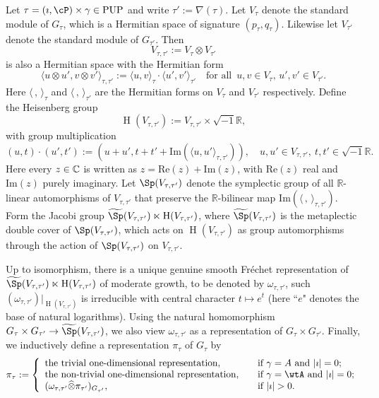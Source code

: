 \documentclass[11pt,a4paper]{amsart}
\def\abs#1{\left|{#1}\right|}
\newcommand{\oH}{\operatorname{H}}
\newcommand{\R}{\mathbb R}
\newcommand{\la}{\langle}
\newcommand{\ra}{\rangle}
\numberwithin{equation}{section}
\theoremstyle{remark}
\begin{document}
Let $\tau=(\imath, \cP)\times \gamma \in \mathrm{PUP}$ and write $\tau':=\nabla(\tau)$. Let $V_\tau$ denote the standard module of $G_\tau$, which is a Hermitian space of signature $(p_\tau, q_\tau)$. Likewise let $V_{\tau'}$ denote the standard module of $G_{\tau'}$. Then \[
  V_{\tau, \tau'}:=V_{\tau}\otimes V_{\tau'}
\]
is also a Hermitian space with the Hermitian form
\[
  \la u\otimes u', v\otimes v'\ra_{\tau, \tau'}:= \la u, v\ra_{\tau}\cdot  \la  u',  v'\ra_{\tau'}\quad \textrm{for all }\, u,v\in V_\tau, \,  u',v'\in V_{\tau'}.
\]
Here $\la \,, \, \ra_{\tau}$ and $\la \,, \, \ra_{\tau'}$ are the Hermitian forms on $V_\tau$ and $V_{\tau'}$ respectively. Define the Heisenberg group
\[
  \oH(V_{\tau, \tau'}):=V_{\tau, \tau'}\times \sqrt{-1}\R,
\]
with group multiplication
\[
  (u,t)\cdot (u',t'):=(u+u', t+t'+\mathrm{Im}(\la u, u'\ra_{\tau, \tau'})), \quad u,u'\in V_{\tau, \tau'}, \ t,t'\in \sqrt{-1}\R.
\]
Here every $z\in \mathbb{C}$ is written as $z=\mathrm{Re}(z)+\mathrm{Im}(z)$, with  $\mathrm{Re}(z)$ real and $\mathrm{Im}(z)$ purely imaginary. Let $\Sp(V_{\tau, \tau'})$ denote the symplectic group of all $\R$-linear automorphisms of $V_{\tau, \tau'}$   that preserve the $\R$-bilinear map
$\mathrm{Im}(\la \, ,\, \ra_{\tau, \tau'})$. Form the Jacobi group
$\widetilde \Sp(V_{\tau, \tau'})\ltimes \oH(V_{\tau, \tau'})$, where
$\widetilde \Sp(V_{\tau, \tau'})$ is the metaplectic double cover of $\Sp(V_{\tau, \tau'})$, which acts on $\oH(V_{\tau, \tau'})$ as group automorphisms through the action of $\Sp(V_{\tau, \tau'})$ on $V_{\tau, \tau'}$.

Up to isomorphism, there is a unique genuine smooth Fr\'echet representation of $\widetilde \Sp(V_{\tau, \tau'})\ltimes \oH(V_{\tau, \tau'})$ of moderate growth, to be denoted by $\omega_{\tau, \tau'}$, such $(\omega_{\tau, \tau'})|_{  \oH(V_{\tau, \tau'})}$ is irreducible with central character $t\mapsto e^t$ (here ``$e$" denotes the  base of natural logarithms). Using the natural homomorphism $G_\tau\times G_{\tau'}\rightarrow \widetilde \Sp(V_{\tau, \tau'})$, we also view $\omega_{\tau, \tau'}$ as a representation of $G_\tau\times G_{\tau'}$. Finally, we inductively define a representation $\pi_\tau$ of $G_\tau$ by
\[
\pi_\tau:=\left\{  \begin{array}{ll}
               \textrm{the trivial one-dimensional representation}, &\quad \textrm{if $\gamma=A$ and  $\abs{\imath}=0$};  \\
               \textrm{the non-trivial one-dimensional representation}, &\quad \textrm{if $\gamma=\wtA$ and  $\abs{\imath}=0$};  \\
               (\omega_{\tau, \tau'}\widehat \otimes  \pi_{\tau'})_{G_{\tau'}}, &\quad \textrm{if   $\abs{\imath}>0$}.
           \end{array}
           \right.
\]
\end{document}
